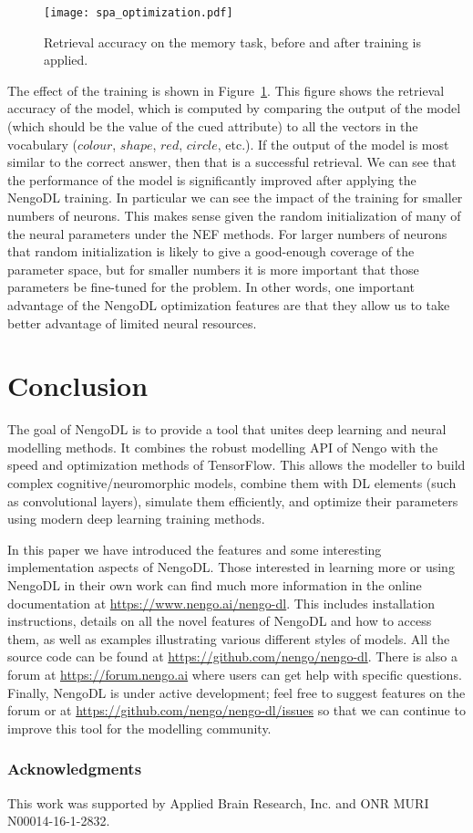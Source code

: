 \documentclass{article}
\begin{document}
\begin{figure}
\centering
\texttt{[image: spa\_optimization.pdf]}
\caption{Retrieval accuracy on the memory task, before and after training is applied.}
\label{fig:spa_optimization}
\end{figure}

The effect of the training is shown in Figure~\ref{fig:spa_optimization}.  This figure shows the retrieval accuracy of the model, which is computed by comparing the output of the model (which should be the value of the cued attribute) to all the vectors in the vocabulary ($colour$, $shape$, $red$, $circle$, etc.).  If the output of the model is most similar to the correct answer, then that is a successful retrieval.  We can see that the performance of the model is significantly improved after applying the NengoDL training.  In particular we can see the impact of the training for smaller numbers of neurons.  This makes sense given the random initialization of many of the neural parameters under the NEF methods. For larger numbers of neurons that random initialization is likely to give a good-enough coverage of the parameter space, but for smaller numbers it is more important that those parameters be fine-tuned for the problem.  In other words, one important advantage of the NengoDL optimization features are that they allow us to take better advantage of limited neural resources.

\section{Conclusion}

The goal of NengoDL is to provide a tool that unites deep learning and neural modelling methods.  It combines the robust modelling API of Nengo with the speed and optimization methods of TensorFlow.  This allows the modeller to build complex cognitive/neuromorphic models, combine them with DL elements (such as convolutional layers), simulate them efficiently, and optimize their parameters using modern deep learning training methods.

In this paper we have introduced the features and some interesting implementation aspects of NengoDL.  Those interested in learning more or using NengoDL in their own work can find much more information in the online documentation at \url{https://www.nengo.ai/nengo-dl}.  This includes installation instructions, details on all the novel features of NengoDL and how to access them, as well as examples illustrating various different styles of models.  All the source code can be found at \url{https://github.com/nengo/nengo-dl}.  There is also a forum at \url{https://forum.nengo.ai} where users can get help with specific questions.  Finally, NengoDL is under active development; feel free to suggest features on the forum or at \url{https://github.com/nengo/nengo-dl/issues} so that we can continue to improve this tool for the modelling community.

\subsubsection*{Acknowledgments}

This work was supported by Applied Brain Research, Inc. and ONR MURI N00014-16-1-2832.

\small



\end{document}
